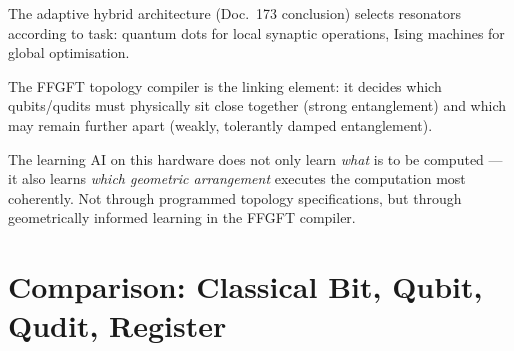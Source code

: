 \begin{significance}
The adaptive hybrid architecture (Doc.~173 conclusion)
selects resonators according to task:
quantum dots for local synaptic operations,
Ising machines for global optimisation.

The FFGFT topology compiler is the linking element:
it decides which qubits/qudits must physically
sit close together (strong entanglement)
and which may remain further apart
(weakly, tolerantly damped entanglement).

The learning AI on this hardware does not only learn
\emph{what} is to be computed ---
it also learns \emph{which geometric arrangement}
executes the computation most coherently.
Not through programmed topology specifications,
but through geometrically informed learning
in the FFGFT compiler.
\end{significance}

\section{Comparison: Classical Bit, Qubit, Qudit, Register}
\label{sec:comparison}

\begin{center}
\end{center}

